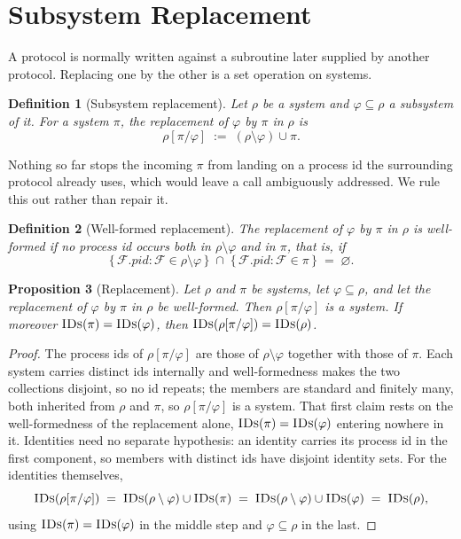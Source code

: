 \documentclass[11pt,a4paper]{article}
\newcommand{\PID}{\mathit{pid}}
\renewcommand{\emptyset}{\varnothing}
\newcommand{\F}{\mathcal{F}}
\newcommand{\op}[1]{\textsc{#1}}
\newcommand{\IDs}{\op{IDs}}
\theoremstyle{accentdef}
\newtheorem{definition}{Definition}[section]
\theoremstyle{accentplain}
\newtheorem{proposition}[definition]{Proposition}
\begin{document}
\section{Subsystem Replacement}\label{sec:repl}

A protocol is normally written against a subroutine later supplied by another protocol. Replacing
one by the other is a set operation on systems.

\begin{definition}[Subsystem replacement]\label{def:repl}
Let $\rho$ be a system and $\varphi \subseteq \rho$ a subsystem of it. For a system $\pi$, the
\emph{replacement of $\varphi$ by $\pi$ in $\rho$} is
\[
  \rho[\pi/\varphi] \;:=\; (\rho \setminus \varphi) \cup \pi .
\]
\end{definition}

Nothing so far stops the incoming $\pi$ from landing on a process id the surrounding protocol
already uses, which would leave a call ambiguously addressed. We rule this out rather than repair
it.

\begin{definition}[Well-formed replacement]\label{def:wf}
The replacement of $\varphi$ by $\pi$ in $\rho$ is \emph{well-formed} if no process id occurs
both in $\rho \setminus \varphi$ and in $\pi$, that is, if
\[
  \{\, \F.\PID : \F \in \rho \setminus \varphi \,\} \;\cap\; \{\, \F.\PID : \F \in \pi \,\} \;=\; \emptyset .
\]
\end{definition}

\begin{proposition}[Replacement]\label{prop:repl}
Let $\rho$ and $\pi$ be systems, let $\varphi \subseteq \rho$, and let the replacement of
$\varphi$ by $\pi$ in $\rho$ be
well-formed. Then $\rho[\pi/\varphi]$ is a system. If moreover $\IDs(\pi) = \IDs(\varphi)$, then
$\IDs(\rho[\pi/\varphi]) = \IDs(\rho)$.
\end{proposition}

\begin{proof}
The process ids of $\rho[\pi/\varphi]$ are those of $\rho \setminus \varphi$ together with those
of $\pi$. Each system carries distinct ids internally and well-formedness makes the two collections
disjoint, so no id repeats; the members are standard and finitely many, both inherited from $\rho$
and $\pi$, so $\rho[\pi/\varphi]$ is a system. That first claim rests on the well-formedness of the
replacement alone, $\IDs(\pi) = \IDs(\varphi)$ entering nowhere in it. Identities need no separate
hypothesis: an identity carries its process id in the first component, so members with distinct
ids have disjoint identity sets. For the identities themselves,
\[
  \IDs(\rho[\pi/\varphi]) \;=\; \IDs(\rho \setminus \varphi) \cup \IDs(\pi) \;=\; \IDs(\rho \setminus \varphi) \cup \IDs(\varphi) \;=\; \IDs(\rho),
\]
using $\IDs(\pi) = \IDs(\varphi)$ in the middle step and $\varphi \subseteq \rho$ in the last.
\end{proof}
\end{document}
